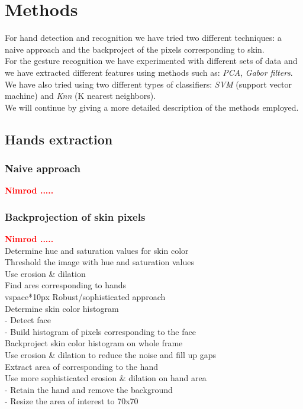 \documentclass[a4paper, 11pt, twocolumn]{article}
\newcommand{\todo}[1]{\textcolor{red}{\textbf{#1}}}
\begin{document}
    \section{Methods}
	\label{sec:methods}
		For hand detection and recognition we have tried two different techniques: a naive approach and the backproject of the pixels corresponding to skin.\\
		\hspace*{10px}For the gesture recognition we have experimented with different sets of data and we have extracted different features using methods such as: \emph{PCA}, \emph{Gabor filters}. We have also tried using two different types of classifiers: \emph{SVM} (support vector machine) and \emph{Knn} (K nearest neighbors).\\
		\hspace*{10px}We will continue by giving a more detailed description of the methods employed. 
        \subsection{Hands extraction}
		\label{sec:Meth_exrctHands}
        \subsubsection{Naive approach}
		\todo{Nimrod .....}\\

        \subsubsection{Backprojection of skin pixels}
        \todo{Nimrod .....}\\
        Determine hue and saturation values for skin color\\
        Threshold the image with hue and saturation values\\
        Use erosion \& dilation\\
        Find ares corresponding to hands\\
        vspace*{10px}
        Robust/sophisticated approach\\
        Determine skin color histogram\\
        - Detect face\\
        - Build histogram of pixels corresponding to the face\\
        Backproject skin color histogram on whole frame\\
        Use erosion \& dilation to reduce the noise and fill up gaps\\
        Extract area of corresponding to the hand\\
        Use more sophisticated erosion \& dilation on hand area\\
        - Retain the hand and remove the background\\
        - Resize the area of interest to 70x70
\end{document}
